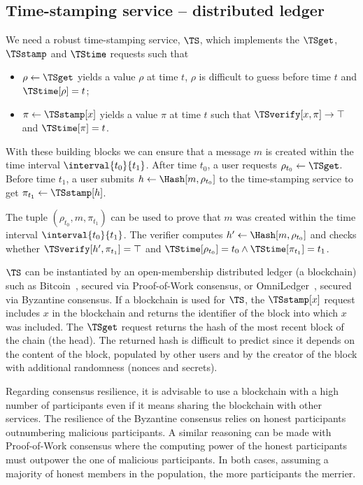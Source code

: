 \subsection{Time-stamping service -- distributed ledger}%
\label{StorageProperties}

We need a robust time-stamping service, \(\TS\), which implements the \(\TSget\), 
\(\TSstamp\) and \(\TStime\) requests such that
\begin{itemize}
  \item \(\rho \gets \TSget\) yields a value \(\rho\) at time \(t\), \(\rho\) is difficult to guess before time \(t\) and \(\TStime[\rho] = t\);
  \item \(\pi\gets \TSstamp[x]\) yields a value \(\pi\) at time \(t\) such that 
    \(\TSverify[x, \pi]\to \top\) and \(\TStime[\pi] = t\).
\end{itemize}

With these building blocks we can ensure that a message \(m\) is created within the time interval \(\interval{t_0}{t_1}\).
After time \(t_0\), a user requests \(\rho_{t_0}\gets \TSget\).
Before time \(t_1\), a user submits \(h\gets \Hash[m, \rho_{t_0}]\) to the time-stamping service to get \(\pi_{t_1}\gets \TSstamp[h]\).

The tuple \((\rho_{t_0}, m, \pi_{t_1})\) can be used to prove that \(m\) was created within the time interval \(\interval{t_0}{t_1}\).
The verifier computes \(h'\gets \Hash[m, \rho_{t_0}]\) and checks whether 
\(\TSverify[h', \pi_{t_1}] = \top\) and \(\TStime[\rho_{t_0}] = t_0\land 
  \TStime[\pi_{t_1}] = t_1\).

\(\TS\) can be instantiated by an open-membership distributed ledger (\eg a blockchain) such as Bitcoin~\cite{Bitcoin}, secured via Proof-of-Work consensus, or OmniLedger~\cite{OmniLedger}, secured via Byzantine consensus.
If a blockchain is used for \(\TS\), the \(\TSstamp[x]\) request includes \(x\) in the blockchain and returns the identifier of the block into which \(x\) was included.
The \(\TSget\) request returns the hash of the most recent block of the chain (the head).
The returned hash is difficult to predict since it depends on the content of the block, populated by other users and by the creator of the block with additional randomness (\eg nonces and secrets).

Regarding consensus resilience, it is advisable to use a blockchain with a high number of participants even if it means sharing the blockchain with other services.
The resilience of the Byzantine consensus relies on honest participants outnumbering malicious participants.
A similar reasoning can be made with Proof-of-Work consensus where the computing power of the honest participants must outpower the one of malicious participants.
In both cases, assuming a majority of honest members in the population, the more participants the merrier.

